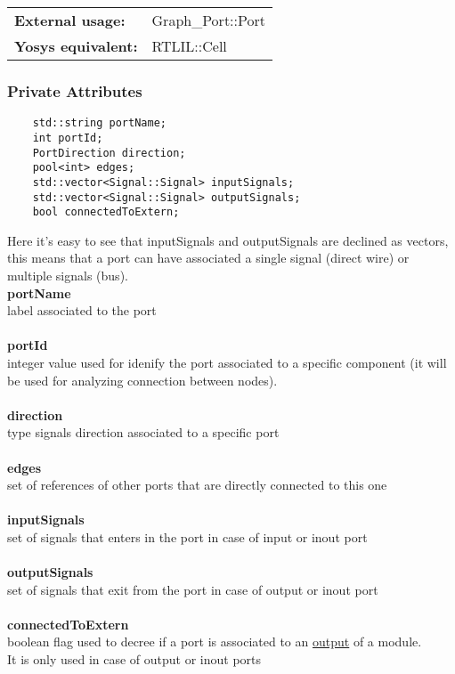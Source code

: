 \documentclass{article}
\begin{document}
\begin{tabular}{ll}
	\textbf{External usage: } & Graph\_Port::Port\\
	\textbf{Yosys equivalent: } & RTLIL::Cell\\
\end{tabular}

\subsubsection{Private Attributes}

\begin{mdframed}[hidealllines=true, backgroundcolor=magenta!10]
	\begin{lstlisting}
	std::string portName;
	int portId;
	PortDirection direction;
	pool<int> edges;
	std::vector<Signal::Signal> inputSignals;
	std::vector<Signal::Signal> outputSignals;
	bool connectedToExtern;
	\end{lstlisting}
\end{mdframed}

Here it's easy to see that inputSignals and outputSignals are declined as vectors, this means that a port can have associated a single signal (direct wire) or 
multiple signals (bus).\\

\textbf{portName}\\
label associated to the port\\\\
\textbf{portId}\\
integer value used for idenify the port associated to a specific component (it will be used for analyzing connection between nodes).\\\\
\textbf{direction}\\
type signals direction associated to a specific port\\\\
\textbf{edges}\\
set of references of other ports that are directly connected to this one\\\\
\textbf{inputSignals}\\
set of signals that enters in the port in case of input or inout port\\\\
\textbf{outputSignals}\\
set of signals that exit from the port in case of output or inout port\\\\
\textbf{connectedToExtern}\\
boolean flag used to decree if a port is associated to an \underline{output} of a module.\\
It is only used in case of output or inout ports\\\\
\end{document}
